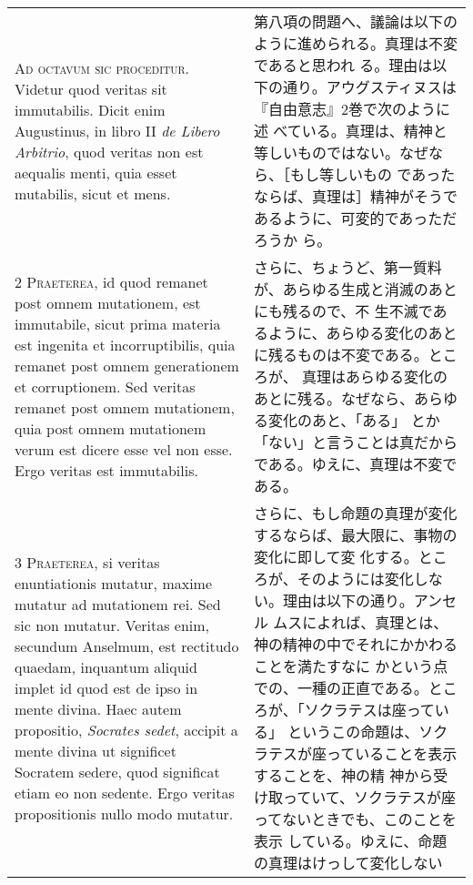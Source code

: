 \documentclass[10pt]{jsarticle} %
\begin{document}
\begin{longtable}{p{21em}p{21em}}

{\huge A}{\scshape d octavum sic proceditur}. Videtur quod veritas sit
immutabilis. Dicit enim Augustinus, in libro II {\itshape de Libero
Arbitrio}, quod veritas non est aequalis menti, quia esset mutabilis,
sicut et mens.

&

第八項の問題へ、議論は以下のように進められる。真理は不変であると思われ
る。理由は以下の通り。アウグスティヌスは『自由意志』2巻で次のように述
べている。真理は、精神と等しいものではない。なぜなら、［もし等しいもの
であったならば、真理は］精神がそうであるように、可変的であっただろうか
ら。


\\


{\scshape 2 Praeterea}, id quod remanet post omnem mutationem, est
immutabile, sicut prima materia est ingenita et incorruptibilis, quia
remanet post omnem generationem et corruptionem. Sed veritas remanet
post omnem mutationem, quia post omnem mutationem verum est dicere
esse vel non esse. Ergo veritas est immutabilis.

&

さらに、ちょうど、第一質料が、あらゆる生成と消滅のあとにも残るので、不
生不滅であるように、あらゆる変化のあとに残るものは不変である。ところが、
真理はあらゆる変化のあとに残る。なぜなら、あらゆる変化のあと、「ある」
とか「ない」と言うことは真だからである。ゆえに、真理は不変である。

\\


{\scshape 3 Praeterea}, si veritas enuntiationis mutatur, maxime
mutatur ad mutationem rei. Sed sic non mutatur. Veritas enim, secundum
Anselmum, est rectitudo quaedam, inquantum aliquid implet id quod est
de ipso in mente divina. Haec autem propositio, {\itshape Socrates
sedet}, accipit a mente divina ut significet Socratem sedere, quod
significat etiam eo non sedente. Ergo veritas propositionis nullo modo
mutatur.

&

さらに、もし命題の真理が変化するならば、最大限に、事物の変化に即して変
 化する。ところが、そのようには変化しない。理由は以下の通り。アンセル
 ムスによれば、真理とは、神の精神の中でそれにかかわることを満たすなに
 かという点での、一種の正直である。ところが、「ソクラテスは座っている」
 というこの命題は、ソクラテスが座っていることを表示することを、神の精
 神から受け取っていて、ソクラテスが座ってないときでも、このことを表示
 している。ゆえに、命題の真理はけっして変化しない


\end{longtable}
\end{document}
